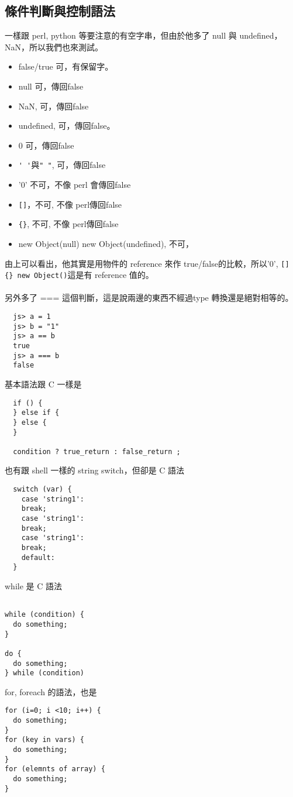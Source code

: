   \subsection{條件判斷與控制語法}
  一樣跟 perl, python 等要注意的有空字串，但由於他多了 null 與 undefined，
  NaN，所以我們也來測試。
  \begin{itemize}
    \item false/true 可，有保留字。
    \item null 可，傳回false
    \item NaN, 可，傳回false
    \item undefined, 可，傳回false。
    \item 0 可，傳回false
    \item \verb=' '=與\verb=" "=, 可，傳回false
    \item '0'  不可，不像 perl 會傳回false
    \item \verb=[]=，不可, 不像 perl傳回false
    \item \verb={}=, 不可, 不像 perl傳回false
    \item new Object(null) new Object(undefined), 不可，
  \end{itemize}
  由上可以看出，他其實是用物件的 reference 來作 true/false的比較，所以'0',
  \verb=[] {} new Object()=這是有 reference 值的。
  \\\\
  另外多了 === 這個判斷，這是說兩邊的東西不經過type 轉換還是絕對相等的。
  \begin{verbatim}
  js> a = 1
  js> b = "1"
  js> a == b
  true
  js> a === b
  false
  \end{verbatim}
  基本語法跟 C 一樣是
  \begin{verbatim}
  if () {
  } else if {
  } else {
  }

  condition ? true_return : false_return ; 
  \end{verbatim}
  也有跟 shell 一樣的 string switch，但卻是 C 語法
  \begin{verbatim}
  switch (var) {
    case 'string1':
    break;
    case 'string1':
    break;
    case 'string1':
    break;
    default:
  }
  \end{verbatim}
  while 是 C 語法
  \begin{verbatim}

while (condition) {
  do something;
}

do {
  do something;
} while (condition)
  \end{verbatim}
  for, foreach 的語法，也是
  \begin{verbatim}
for (i=0; i <10; i++) {
  do something;
}
for (key in vars) {
  do something;
}
for (elemnts of array) {
  do something;
}
  \end{verbatim}
